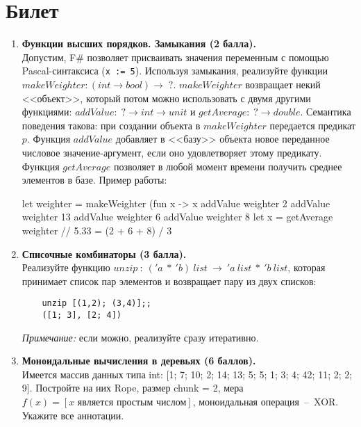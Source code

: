 \documentclass[a4paper,11pt]{article}
\renewcommand{\emph}[1]{\textit{#1}}
\newcommand{\<}{\langle}
\renewcommand{\>}{\rangle}
\begin{document}
\section*{Билет }
\begin{enumerate}
\item \textbf{Функции высших порядков. Замыкания (2 балла).}\\
  Допустим, F\# позволяет присваивать значения переменным с помощью
  Pascal-синтаксиса (\texttt{x := 5}). Используя замыкания, реализуйте
  функции $makeWeighter: (int \to bool) \to \;?$. $makeWeighter$ возвращает
  некий <<объект>>, который потом можно использовать с двумя другими
  функциями: $addValue: \;? \to int \to unit$ и $getAverage: \;? \to double$.
  Семантика поведения такова: при создании объекта в $makeWeighter$
  передается предикат $p$. Функция $addValue$ добавляет в <<базу>> объекта
  новое переданное числовое значение-аргумент, если оно удовлетворяет этому
  предикату. Функция $getAverage$ позволяет в любой момент времени получить
  среднее элементов в базе. Пример работы:
  \begin{fsharp}
    let weighter = makeWeighter (fun x -> x %
    addValue weighter 2
    addValue weighter 13
    addValue weighter 6
    addValue weighter 8
    let x = getAverage weighter // 5.33 = (2 + 6 + 8) / 3
  \end{fsharp}

\item \textbf{Списочные комбинаторы (3 балла).}\\
  Реализуйте функцию $unzip~:~('\!a~*~'\!b)~list~\rightarrow~
  '\!a~list~*~'\!b~list$, которая принимает список пар элементов и возвращает
  пару из двух списков:
  \begin{lstlisting}
    unzip [(1,2); (3,4)];;
    ([1; 3], [2; 4])
  \end{lstlisting}
  \emph{Примечание:} если можно, реализуйте сразу итеративно.

\item \textbf{Моноидальные вычисления в деревьях (6 баллов).}\\
  Имеется массив данных типа int: [1; 7; 10; 2; 14; 13; 5; 5; 1; 3;
  4; 42; 11; 2; 2; 9]. Постройте на них Rope, размер chunk = 2, мера
  $f(x) = [x\text{ является простым числом}]$, моноидальная операция~--~XOR.
  Укажите все аннотации.
\end{enumerate}
\newpage 
\end{document}
